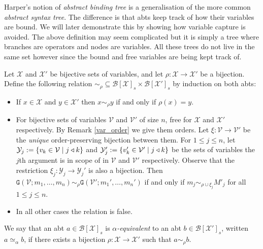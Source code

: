 \begin{remark}
    Harper's notion of \emph{abstract binding tree} is a generalisation of the more common \emph{abstract syntax tree}. The difference is that abts keep track of how their variables are bound. We will later demonstrate this by showing how variable capture is avoided. The above definition may seem complicated but it is simply a tree where branches are operators and nodes are variables. All these trees do not live in the same set however since the bound and free variables are being kept track of.
\end{remark}

\begin{defin}
    Let $\mathcal{X}$ and $\mathcal{X}'$ be bijective sets of variables, and let $\rho : \mathcal{X} \to \mathcal{X'}$ be a bijection. Define the following relation $\sim_\rho \subseteq \mathcal{B}[\mathcal{X}]_s \times \mathcal{B}[\mathcal{X}']_s$ by induction on both abts:
    \begin{itemize}
        \item If $x \in \mathcal{X}$ and $y \in \mathcal{X}'$ then $x \sim_\rho y $ if and only if $\rho(x) = y$.
        \item For bijective sets of variables $\mathcal{V}$ and $\mathcal{V}'$ of size $n$, free for $\mathcal{X}$ and $\mathcal{X}'$ respectively. By Remark \ref{var_order} we give them orders. Let $\xi : \mathcal{V} \to \mathcal{V}'$ be the \emph{unique} order-preserving bijection between them. For $1 \le j \le n$, let $\mathcal{Y}_j := \{ v_k \in \mathcal{V} \mid j \triangleleft k\}$ and $\mathcal{Y}_j' := \{ v_k' \in \mathcal{V}' \mid j \triangleleft k \}$ be the sets of variables the $j$th argument is in scope of in $\mathcal{V}$ and $\mathcal{V}'$ respectively. Observe that the restriction $\xi_j : \mathcal{Y}_j \to \mathcal{Y}_j'$ is also a bijection. Then $\mathtt{G}(\mathcal{V}; m_1, \dots, m_n) \sim_\rho \mathtt{G}(\mathcal{V}'; m_1', \dots, m_n')$ if and only if $m_j \sim_{\rho \cup \xi_j} M'_j$ for all $1 \le j \le n$.
        \item In all other cases the relation is false.
    \end{itemize}

    We say that an abt $a \in \mathcal{B}[\mathcal{X}]_s$ is \emph{$\alpha$-equivalent} to an abt $b \in \mathcal{B}[\mathcal{X}']_s$, written $a \simeq_{\alpha} b$, if there exists a bijection $\rho : \mathcal{X} \to \mathcal{X'}$ such that $a \sim_\rho b$.
\end{defin}


